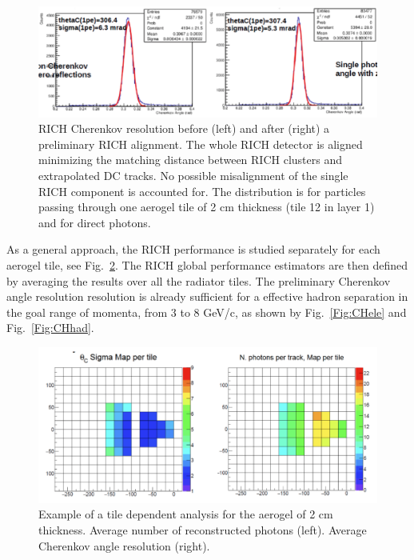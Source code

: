 \documentclass[final,5p,times,twocolumn]{elsarticle}
\begin{document}
\begin{figure}[t]
\begin{center}
\includegraphics[width=1.0\columnwidth]{EPS/Reso_align.png}
\end{center}
\caption{RICH Cherenkov resolution before (left) and after (right) a preliminary RICH alignment.
The whole RICH detector is aligned minimizing the matching distance between RICH clusters 
and extrapolated DC tracks. No possible misalignment of the single RICH component is accounted for.
The distribution is for particles passing through one aerogel tile of 2 cm thickness (tile 12
in layer 1) and for direct photons.}
\label{Fig:Align}
\end{figure}

As a general approach, the RICH performance is studied separately for each aerogel tile, see Fig.~\ref{Fig:Tile}.
The RICH global performance estimators are then defined by averaging the results over
all the radiator tiles. The preliminary Cherenkov angle resolution resolution is already sufficient
for a effective hadron separation in the goal range of momenta, from 3 to 8 GeV/c, as shown 
by Fig.~\ref{Fig:CHele} and Fig.~\ref{Fig:CHhad}. 

\begin{figure}[t]
\begin{center}
\includegraphics[width=1.0\columnwidth]{EPS/Tile_analysis.png}
\end{center}
\caption{Example of a tile dependent analysis for the aerogel of 2 cm thickness. Average number 
of reconstructed photons (left). Average Cherenkov angle resolution (right).}
\label{Fig:Tile}
\end{figure}
\end{document}
